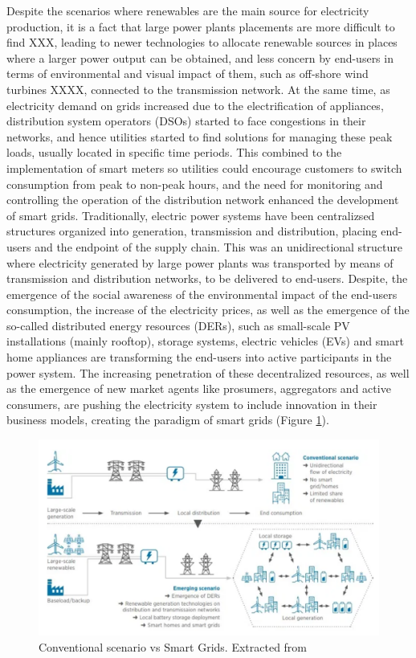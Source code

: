Despite the scenarios where renewables are the main source for electricity production, it is a fact that large power plants placements are more difficult to find XXX, leading to newer technologies to allocate renewable sources in places where a larger power output can be obtained, and less concern by end-users in terms of environmental and visual impact of them, such as off-shore wind turbines XXXX, connected to the transmission network. At the same time, as electricity demand on grids increased due to the electrification of appliances, distribution system operators (DSOs) started to face congestions in their networks, and hence utilities started to find solutions for managing these peak loads, usually located in specific time periods.  This combined to the implementation of smart meters so utilities could encourage customers to switch consumption from peak to non-peak hours, and the need for monitoring and controlling the operation of the distribution network enhanced the development of smart grids. Traditionally, electric power systems have been centralizsed structures organized into generation, transmission and distribution, placing end-users and the endpoint of the supply chain. This was an unidirectional structure where electricity generated by large power plants was transported by means of transmission and distribution networks, to be delivered to end-users. Despite, the emergence of the social awareness of the environmental impact of the end-users consumption, the increase of the electricity prices, as well as the emergence of the so-called distributed energy resources (DERs), such as small-scale PV installations (mainly rooftop), storage systems, electric vehicles (EVs) and smart home appliances are transforming the end-users into active participants in the power system. The increasing penetration of these decentralized resources, as well as the emergence of new market agents like prosumers, aggregators and active consumers, are pushing the electricity system to include innovation in their business models, creating the paradigm of smart grids (Figure \ref{fig:IRENA-DSO}). 

\begin{figure}[h]
	\centering 
	\includegraphics[width=0.9\columnwidth ]{ChapterIntro/Figures/Irena-DSO-1.png}
		\caption{Conventional scenario vs Smart Grids. Extracted from \cite{IRENA2018}}  
		\label{fig:IRENA-DSO}
\end{figure}


